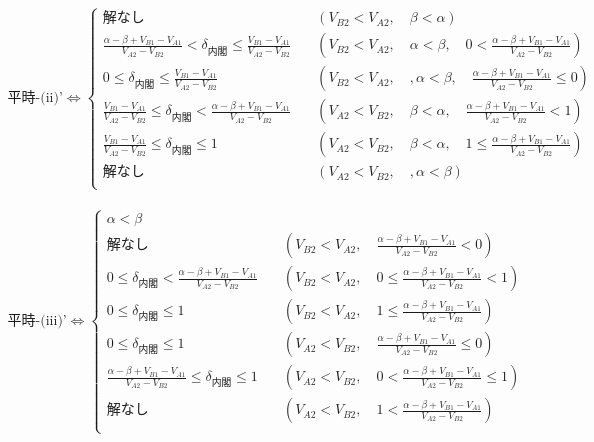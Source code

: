 \documentclass[main.tex]{subfiles}
\begin{document}
\begin{align*}
    \text{平時-(ii)'} \Leftrightarrow 
    \begin{cases}
        解なし \quad &(V_{B2} < V_{A2},\quad \beta < \alpha) \\[1em]
        \frac{\alpha-\beta + V_{B1}-V_{A1}}{V_{A2} - V_{B2}} < \delta_{内閣} \le   \frac{ V_{B1} - V_{A1} }{ V_{A2} - V_{B2} } \quad &(V_{B2} < V_{A2},\quad \alpha < \beta, \quad  0 < \frac{\alpha-\beta + V_{B1}-V_{A1}}{V_{A2} - V_{B2}}) \\[1em]
        0 \le \delta_{内閣} \le  \frac{ V_{B1} - V_{A1} }{ V_{A2} - V_{B2} } \quad &(V_{B2} < V_{A2},\quad, \alpha < \beta,\quad \frac{\alpha-\beta + V_{B1}-V_{A1}}{V_{A2} - V_{B2}} \le 0)\\[1em]
        \frac{ V_{B1} - V_{A1} }{ V_{A2} - V_{B2} } \le \delta_{内閣} <  \frac{\alpha-\beta + V_{B1}-V_{A1}}{V_{A2} - V_{B2}} \quad &(V_{A2} < V_{B2},\quad \beta < \alpha, \quad \frac{\alpha-\beta + V_{B1}-V_{A1}}{V_{A2} - V_{B2}} < 1) \\[1em]
        \frac{ V_{B1} - V_{A1} }{ V_{A2} - V_{B2} } \le \delta_{内閣} \le 1 \quad &(V_{A2} < V_{B2},\quad \beta < \alpha, \quad 1 \le \frac{\alpha-\beta + V_{B1}-V_{A1}}{V_{A2} - V_{B2}}) \\[1em]
        解なし \quad &(V_{A2} < V_{B2},\quad, \alpha < \beta)\\[1em]
    \end{cases}
\end{align*}

\begin{align*}
    \text{平時-(iii)'} \Leftrightarrow 
    \begin{cases}
        \alpha < \beta \\[1em]
        解なし \quad &( V_{B2} < V_{A2} ,\quad \frac{\alpha-\beta + V_{B1}-V_{A1}}{V_{A2} - V_{B2}} < 0 )\\[1em]
        0 \le \delta_{内閣} < \frac{\alpha-\beta + V_{B1}-V_{A1}}{V_{A2} - V_{B2}}  \quad &( V_{B2} < V_{A2} ,\quad 0 \le \frac{\alpha-\beta + V_{B1}-V_{A1}}{V_{A2} - V_{B2}} < 1) \\[1em]
        0 \le \delta_{内閣} \le 1  \quad &( V_{B2} < V_{A2} ,\quad 1 \le \frac{\alpha-\beta + V_{B1}-V_{A1}}{V_{A2} - V_{B2}}) \\[1em]
        0 \le \delta_{内閣} \le 1 \quad &( V_{A2} < V_{B2} ,\quad \frac{\alpha-\beta + V_{B1}-V_{A1}}{V_{A2} - V_{B2}} \le 0 )\\[1em]
        \frac{\alpha-\beta + V_{B1}-V_{A1}}{V_{A2} - V_{B2}} \le \delta_{内閣} \le 1  \quad &( V_{A2} < V_{B2} ,\quad 0 < \frac{\alpha-\beta + V_{B1}-V_{A1}}{V_{A2} - V_{B2}} \le 1) \\[1em]
        解なし  \quad &( V_{A2} < V_{B2} ,\quad 1 < \frac{\alpha-\beta + V_{B1}-V_{A1}}{V_{A2} - V_{B2}}) \\[1em]
    \end{cases}
\end{align*}
\end{document}
